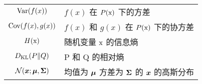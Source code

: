\begin{minipage}{\textwidth}
\begin{tabular}{cp{3.25in}}
$\displaystyle \mathrm{Var}(f(x)) $ & $f(x)$ 在 $P({\textnormal{x}})$ 下的方差\\
$\displaystyle \mathrm{Cov}(f(x),g(x)) $ & $f(x)$ 和 $g(x)$ 在 $P({\textnormal{x}})$ 下的协方差\\
$\displaystyle H({\textnormal{x}}) $ & 随机变量 ${\textnormal{x}}$ 的信息熵 \\
$\displaystyle D_{\mathrm{KL}} ( P \Vert Q ) $ & P 和 Q 的相对熵 \\
$\displaystyle \mathcal{N} ( {\bm{x}} ; {\bm{\mu}} , {\bm{\Sigma}})$ & 均值为 ${\bm{\mu}}$ 方差为 ${\bm{\Sigma}}$ 的 ${\bm{x}}$ 的高斯分布 \\
\end{tabular}
\egroup
{}
\end{minipage}

\vspace{\notationgap}
